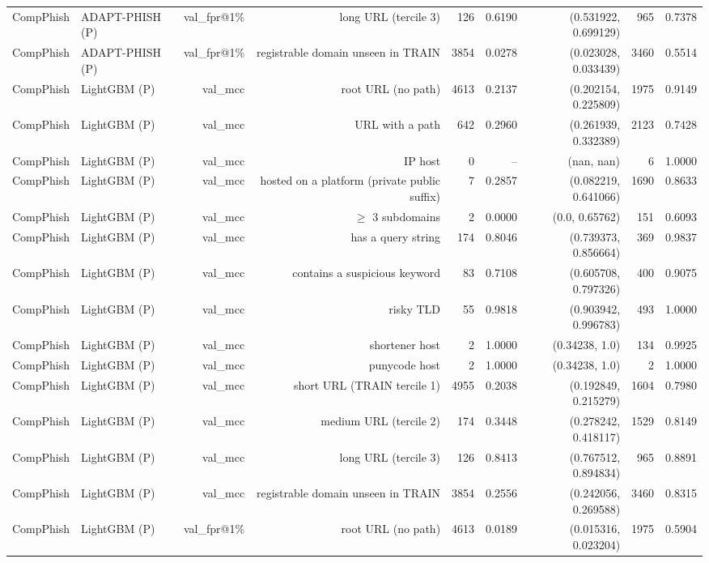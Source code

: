 \begin{table}[t]
\begin{tabular}{llrrrrrrr}
CompPhish & ADAPT-PHISH (P) & val\_fpr@1\% & long URL (tercile 3) & 126 & 0.6190 & (0.531922, 0.699129) & 965 & 0.7378 \\
CompPhish & ADAPT-PHISH (P) & val\_fpr@1\% & registrable domain unseen in TRAIN & 3854 & 0.0278 & (0.023028, 0.033439) & 3460 & 0.5514 \\
CompPhish & LightGBM (P) & val\_mcc & root URL (no path) & 4613 & 0.2137 & (0.202154, 0.225809) & 1975 & 0.9149 \\
CompPhish & LightGBM (P) & val\_mcc & URL with a path & 642 & 0.2960 & (0.261939, 0.332389) & 2123 & 0.7428 \\
CompPhish & LightGBM (P) & val\_mcc & IP host & 0 & -- & (nan, nan) & 6 & 1.0000 \\
CompPhish & LightGBM (P) & val\_mcc & hosted on a platform (private public suffix) & 7 & 0.2857 & (0.082219, 0.641066) & 1690 & 0.8633 \\
CompPhish & LightGBM (P) & val\_mcc & $\geq$ 3 subdomains & 2 & 0.0000 & (0.0, 0.65762) & 151 & 0.6093 \\
CompPhish & LightGBM (P) & val\_mcc & has a query string & 174 & 0.8046 & (0.739373, 0.856664) & 369 & 0.9837 \\
CompPhish & LightGBM (P) & val\_mcc & contains a suspicious keyword & 83 & 0.7108 & (0.605708, 0.797326) & 400 & 0.9075 \\
CompPhish & LightGBM (P) & val\_mcc & risky TLD & 55 & 0.9818 & (0.903942, 0.996783) & 493 & 1.0000 \\
CompPhish & LightGBM (P) & val\_mcc & shortener host & 2 & 1.0000 & (0.34238, 1.0) & 134 & 0.9925 \\
CompPhish & LightGBM (P) & val\_mcc & punycode host & 2 & 1.0000 & (0.34238, 1.0) & 2 & 1.0000 \\
CompPhish & LightGBM (P) & val\_mcc & short URL (TRAIN tercile 1) & 4955 & 0.2038 & (0.192849, 0.215279) & 1604 & 0.7980 \\
CompPhish & LightGBM (P) & val\_mcc & medium URL (tercile 2) & 174 & 0.3448 & (0.278242, 0.418117) & 1529 & 0.8149 \\
CompPhish & LightGBM (P) & val\_mcc & long URL (tercile 3) & 126 & 0.8413 & (0.767512, 0.894834) & 965 & 0.8891 \\
CompPhish & LightGBM (P) & val\_mcc & registrable domain unseen in TRAIN & 3854 & 0.2556 & (0.242056, 0.269588) & 3460 & 0.8315 \\
CompPhish & LightGBM (P) & val\_fpr@1\% & root URL (no path) & 4613 & 0.0189 & (0.015316, 0.023204) & 1975 & 0.5904 \\

\end{tabular}
\end{table}
